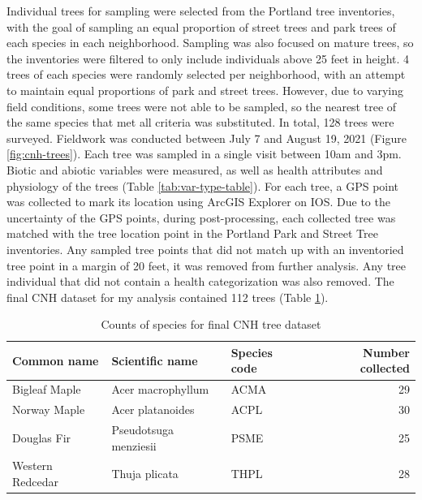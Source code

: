 \documentclass[12pt,twoside]{reedthesis}
\begin{document}
Individual trees for sampling were selected from the Portland tree
inventories, with the goal of sampling an equal proportion of street
trees and park trees of each species in each neighborhood. Sampling was
also focused on mature trees, so the inventories were filtered to only
include individuals above 25 feet in height. 4 trees of each species
were randomly selected per neighborhood, with an attempt to maintain
equal proportions of park and street trees. However, due to varying
field conditions, some trees were not able to be sampled, so the nearest
tree of the same species that met all criteria was substituted. In
total, 128 trees were surveyed. Fieldwork was conducted between July 7
and August 19, 2021 (Figure \ref{fig:cnh-trees}). Each tree was sampled
in a single visit between 10am and 3pm. Biotic and abiotic variables
were measured, as well as health attributes and physiology of the trees
(Table \ref{tab:var-type-table}). For each tree, a GPS point was
collected to mark its location using ArcGIS Explorer on IOS. Due to the
uncertainty of the GPS points, during post-processing, each collected
tree was matched with the tree location point in the Portland Park and
Street Tree inventories. Any sampled tree points that did not match up
with an inventoried tree point in a margin of 20 feet, it was removed
from further analysis. Any tree individual that did not contain a health
categorization was also removed. The final CNH dataset for my analysis
contained 112 trees (Table \ref{tab:cnh-tree-counts-2}).
\begin{table}

\caption[Final CNH Tree counts]{\label{tab:cnh-tree-counts-2}Counts of species for final CNH tree dataset}
\centering
\begin{tabular}[t]{lllr}
\toprule
Common name & Scientific name & Species code & Number collected\\
\midrule
Bigleaf Maple & Acer macrophyllum & ACMA & 29\\
Norway Maple & Acer platanoides & ACPL & 30\\
Douglas Fir & Pseudotsuga menziesii & PSME & 25\\
Western Redcedar & Thuja plicata & THPL & 28\\
\bottomrule
\end{tabular}
\end{table}
\end{document}
